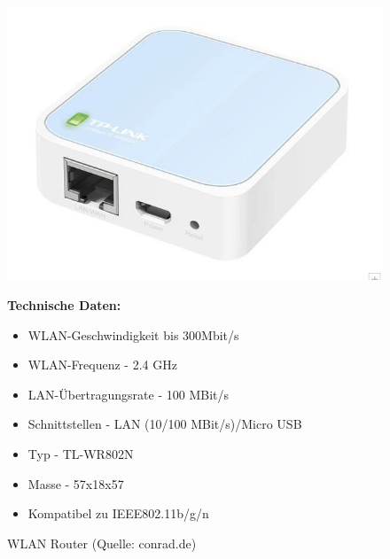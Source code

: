 \begin{figure}[htb]
	\centering
	\begin{minipage}{0.49\linewidth}
		\centering
		\includegraphics[scale=0.5]{images/WLAN.jpg}
		\caption{WLAN Router \newline (Quelle: conrad.de)}
	\end{minipage}
	\begin{minipage}{0.4\linewidth}
		\textbf{Technische Daten:} 
		\begin{itemize} 
			\item WLAN-Geschwindigkeit bis 300Mbit/s
			\item WLAN-Frequenz - 2.4 GHz
			\item LAN-Übertragungsrate - 100 MBit/s
			\item Schnittstellen - LAN (10/100 MBit/s)/Micro USB
			\item Typ - TL-WR802N 
			\item Masse - 57x18x57
			\item Kompatibel zu IEEE802.11b/g/n
			\end{itemize}
	\end{minipage}
\end{figure}
\pagebreak

